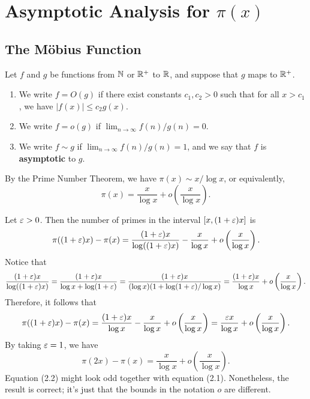 \section{Asymptotic Analysis for $\pi(x)$}

\subsection{The M\"obius Function}

\begin{defn}
Let $f$ and $g$ be functions from $\mathbb{N}$ or $\mathbb{R}^+$ to $\mathbb{R}$, and suppose that $g$ maps to $\mathbb{R}^+$. 
\begin{enumerate}[(1)]
    \item We write $f = O(g)$ if there exist constants $c_1, c_2 > 0$ such that for all $x > c_1$, 
    we have $|f(x)| \leq c_2 g(x)$. 
    \item We write $f = o(g)$ if $\lim_{n\to\infty} f(n)/g(n) = 0$. 
    \item We write $f \sim g$ if $\lim_{n\to\infty} f(n)/g(n) = 1$, and we say that $f$ is 
    {\bf asymptotic} to $g$. 
\end{enumerate}
\end{defn}

By the Prime Number Theorem, we have $\pi(x) \sim x/\log x$, or equivalently, 
\begin{equation}
    \pi(x) = \frac{x}{\log x} + o\left( \frac{x}{\log x} \right). 
\end{equation}
\begin{remark}
Let $\varepsilon > 0$. Then the number of primes in the interval $[x, (1+\varepsilon)x]$ is 
\[ \pi((1+\varepsilon)x) - \pi(x) = \frac{(1+\varepsilon)x}{\log((1+\varepsilon)x)} - \frac{x}{\log x} + o\left( \frac{x}{\log x} \right). \]
Notice that 
\[ \frac{(1+\varepsilon)x}{\log((1+\varepsilon)x)} = \frac{(1+\varepsilon)x}{\log x + \log(1+\varepsilon)} 
= \frac{(1+\varepsilon)x}{(\log x)(1 + \log(1+\varepsilon)/\log x)} = \frac{(1+\varepsilon)x}{\log x} + o\left( \frac{x}{\log x} \right). \]
Therefore, it follows that 
\[ \pi((1+\varepsilon)x) - \pi(x) = \frac{(1+\varepsilon)x}{\log x} - \frac{x}{\log x} + o\left( \frac{x}{\log x} \right) = \frac{\varepsilon x}{\log x} + o\left( \frac{x}{\log x} \right). \]
By taking $\varepsilon = 1$, we have 
\begin{equation}
    \pi(2x) - \pi(x) = \frac{x}{\log x} + o\left( \frac{x}{\log x} \right).
\end{equation} 
Equation (2.2) might look odd together with equation (2.1). Nonetheless, the result is 
correct; it's just that the bounds in the notation $o$ are different. 
\end{remark}

